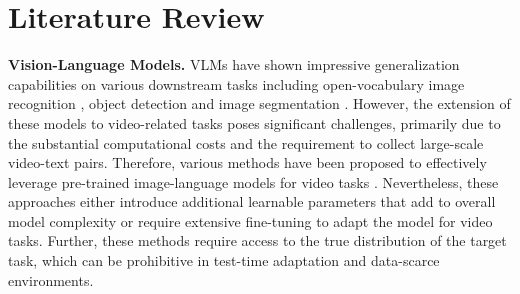 \documentclass{article} \usepackage{iclr2024_conference,times}
\begin{document}
\section{Literature Review}


\textbf{Vision-Language Models.} VLMs \citep{radford2021learning,jia2021scaling} have shown impressive generalization capabilities on various downstream tasks including open-vocabulary image recognition \citep{zhang2021tip,zhou2022learning,zhou2022conditional}, object detection \citep{gu2021open,rao2022denseclip,zhou2022detecting} and image segmentation \citep{ding2022decoupling,zhou2022extract}. However, the extension of these models to video-related tasks poses significant challenges, primarily due to the substantial computational costs and the requirement to collect large-scale video-text pairs. Therefore, various methods have been proposed to effectively leverage pre-trained image-language models for video tasks \citep{Rasheed_2023_CVPR,wang2021actionclip, yang2023aim,wasim2023vita}. Nevertheless, these approaches either introduce additional learnable parameters that add to overall model complexity or require extensive fine-tuning to adapt the model for video tasks. Further, these methods require access to the true distribution of the target task, which can be prohibitive in test-time adaptation and data-scarce environments.
\end{document}

